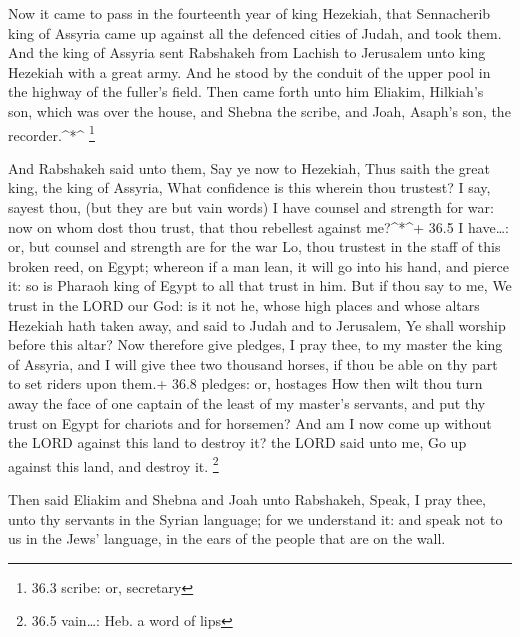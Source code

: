  Now it came to pass in the fourteenth year of king
Hezekiah, that Sennacherib king of Assyria came up against all the
defenced cities of Judah, and took them.  And the king of
Assyria sent Rabshakeh from Lachish to Jerusalem unto king Hezekiah with
a great army. And he stood by the conduit of the upper pool in the
highway of the fuller's field.  Then came forth unto him
Eliakim, Hilkiah's son, which was over the house, and Shebna the scribe,
and Joah, Asaph's son, the recorder.\^{}*\^{} \footnote{36.3 scribe: or,
  secretary}

 And Rabshakeh said unto them, Say ye now to Hezekiah, Thus
saith the great king, the king of Assyria, What confidence is this
wherein thou trustest?  I say, sayest thou, (but they are
but vain words) I have counsel and strength for war: now on whom dost
thou trust, that thou rebellest against me?\^{}*\^{}+ 36.5 I have\ldots:
or, but counsel and strength are for the war  Lo, thou
trustest in the staff of this broken reed, on Egypt; whereon if a man
lean, it will go into his hand, and pierce it: so is Pharaoh king of
Egypt to all that trust in him.  But if thou say to me, We
trust in the LORD our God: is it not he, whose high places and whose
altars Hezekiah hath taken away, and said to Judah and to Jerusalem, Ye
shall worship before this altar?  Now therefore give
pledges, I pray thee, to my master the king of Assyria, and I will give
thee two thousand horses, if thou be able on thy part to set riders upon
them.+ 36.8 pledges: or, hostages  How then wilt thou turn
away the face of one captain of the least of my master's servants, and
put thy trust on Egypt for chariots and for horsemen?  And
am I now come up without the LORD against this land to destroy it? the
LORD said unto me, Go up against this land, and destroy it. \footnote{36.5
  vain\ldots: Heb. a word of lips}

 Then said Eliakim and Shebna and Joah unto Rabshakeh,
Speak, I pray thee, unto thy servants in the Syrian language; for we
understand it: and speak not to us in the Jews' language, in the ears of
the people that are on the wall.

